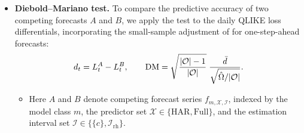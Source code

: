 \begin{itemize}
\item \textbf{Diebold--Mariano test.} To compare the predictive accuracy of two competing forecasts $A$ and $B$, we apply the \citet{DieboldMariano1995} test to the daily QLIKE loss differentials, incorporating the small-sample adjustment of \citet{HarveyLeybourneNewbold1997} for one-step-ahead forecasts:
  \[
    d_t = L_t^{A} - L_t^{B}, \qquad
    \mathrm{DM} = \sqrt{\frac{|\mathcal O| - 1}{|\mathcal O|}}\;
      \frac{\bar d}{\sqrt{\hat\Omega / |\mathcal O|}} .
  \]
  \begin{itemize}
  \item Here $A$ and $B$ denote competing forecast series $f_{m,\mathcal X,\mathcal I}$, indexed by the model class $m$, the predictor set $\mathcal X \in \{\mathrm{HAR}, \mathrm{Full}\}$, and the estimation interval set $\mathcal I \in \{\{c\}, \mathcal I_{\mathrm{rh}}\}$.

\end{itemize}
\end{itemize}

